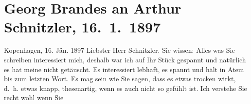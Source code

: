 

         
         \renewcommand{\erwaehntePersonen}{Personen: Richard Beer-Hofmann, Astrid Brandes, Paul Goldmann, Henrik Ibsen, Edith Philipp, William Shakespeare}
         \renewcommand{\erwaehnteOrte}{Orte: Havnegade, Kopenhagen, Wien}
         \renewcommand{\erwaehnteWerke}{Werke: Anatol, Freiwild. Schauspiel in 3 Akten, William Shakespeare}
               \section[Georg Brandes an Arthur Schnitzler, 16. 1. 1897]{ Georg Brandes an Arthur Schnitzler, 16. 1. 1897}\nopagebreak{}\rehead{ }\begin{ledgroupsized}[t]{13cm}\normalsize\beginnumbering \toendnotes[C]{\smallbreak\pagebreak[2]} 
\toendnotes[C]{\smallbreak}\pstart
           \raggedleft{}{\pb}Kopenhagen, 16.{ }Jän.{ }1897\pend
           \pstart\center{}Liebster Herr Schnitzler.\pend\pstart
           Sie wissen: Alles was Sie schreiben interessiert mich, deshalb war ich auf Ihr Stück gespannt und natürlich es
               hat meine \label{T_L00639-1v}\label{T_L00639-1h} nicht getäuscht. Es interessiert lebhaft, es
               spannt und hält in Atem bis zum letzten Wort.\pend
           \pstart
           Es mag sein wie Sie sagen, dass es etwas trocken wirkt, d. h. etwas knapp,
               thesenartig, wenn es auch nicht so gefühlt ist. Ich verstehe Sie recht wohl wenn Sie

\end{ledgroupsized}
